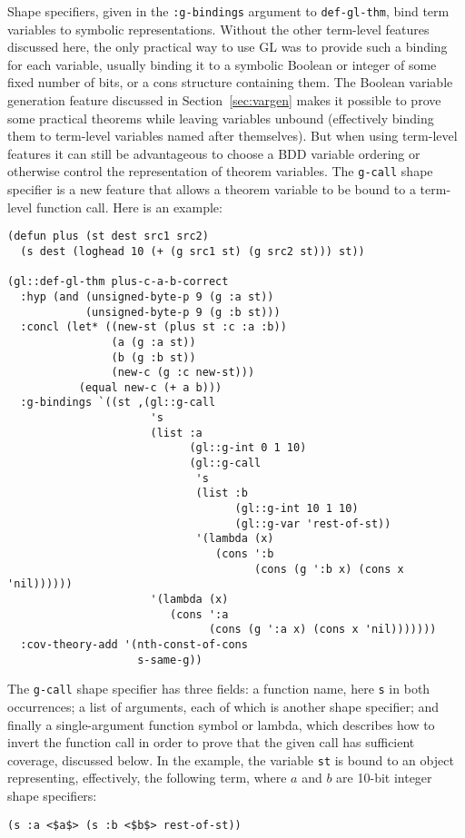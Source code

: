 \documentclass[submission,copyright,creativecommons]{eptcs}
\begin{document}
Shape specifiers, given in the \texttt{:g-bindings} argument to
\texttt{def-gl-thm}, bind term variables to symbolic representations.
Without the other term-level features discussed here, the only
practical way to use GL was to provide such a binding for each
variable, usually binding it to a symbolic Boolean or integer of some
fixed number of bits, or a cons structure containing them.  The
Boolean variable generation feature discussed in
Section~\ref{sec:vargen} makes it possible to prove some practical
theorems while leaving variables unbound (effectively binding them to
term-level variables named after themselves). But when using
term-level features it can still be advantageous to choose a BDD
variable ordering or otherwise control the representation of theorem
variables.  The \texttt{g-call} shape specifier is a new feature that
allows a theorem variable to be bound to a term-level function call.
Here is an example:
\begin{verbatim}
(defun plus (st dest src1 src2)
  (s dest (loghead 10 (+ (g src1 st) (g src2 st))) st))

(gl::def-gl-thm plus-c-a-b-correct
  :hyp (and (unsigned-byte-p 9 (g :a st))
            (unsigned-byte-p 9 (g :b st)))
  :concl (let* ((new-st (plus st :c :a :b))
                (a (g :a st))
                (b (g :b st))
                (new-c (g :c new-st)))
           (equal new-c (+ a b)))
  :g-bindings `((st ,(gl::g-call
                      's
                      (list :a
                            (gl::g-int 0 1 10)
                            (gl::g-call
                             's
                             (list :b
                                   (gl::g-int 10 1 10)
                                   (gl::g-var 'rest-of-st))
                             '(lambda (x)
                                (cons ':b
                                      (cons (g ':b x) (cons x 'nil))))))
                      '(lambda (x)
                         (cons ':a
                               (cons (g ':a x) (cons x 'nil)))))))
  :cov-theory-add '(nth-const-of-cons
                    s-same-g))
\end{verbatim}
The \texttt{g-call} shape specifier has three fields: a function name,
here \texttt{s} in both occurrences; a list of arguments, each of
which is another shape specifier; and finally a single-argument
function symbol or lambda, which describes how to invert the function
call in order to prove that the given call has sufficient coverage,
discussed below.  In the example, the variable \texttt{st} is bound to
an object representing, effectively, the following term, where $a$ and
$b$ are 10-bit integer shape specifiers:
\begin{lstlisting}
(s :a <$a$> (s :b <$b$> rest-of-st))
\end{lstlisting}
\end{document}
